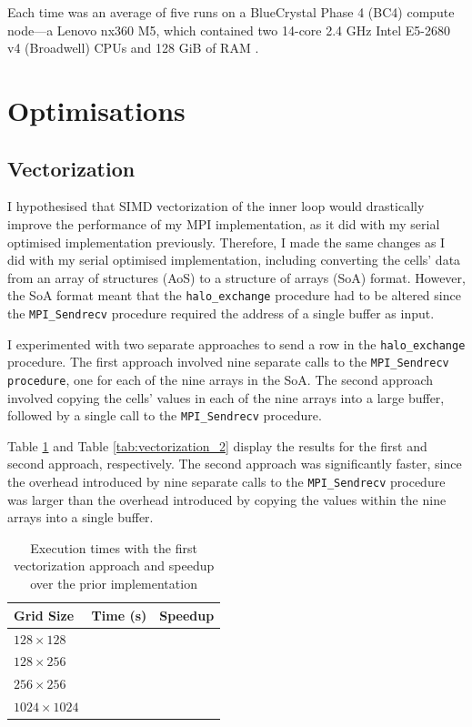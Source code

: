 \documentclass[twocolumn, a4paper]{article}
\begin{document}
Each time was an average of five runs on a BlueCrystal Phase 4 (BC4) compute node---a Lenovo nx360 M5, which contained two 14-core 2.4 GHz Intel E5-2680 v4 (Broadwell) CPUs and 128 GiB of RAM \cite{bcp4}.

\section{Optimisations}

\subsection{Vectorization}

I hypothesised that SIMD vectorization of the inner loop would drastically improve the performance of my MPI implementation, as it did with my serial optimised implementation previously.
Therefore, I made the same changes as I did with my serial optimised implementation, including converting the cells' data from an array of structures (AoS) to a structure of arrays (SoA) format.
However, the SoA format meant that the \texttt{halo\_exchange} procedure had to be altered since the \texttt{MPI\_Sendrecv} procedure required the address of a single buffer as input.

I experimented with two separate approaches to send a row in the \texttt{halo\_exchange} procedure.
The first approach involved nine separate calls to the \texttt{MPI\_Sendrecv procedure}, one for each of the nine arrays in the SoA.
The second approach involved copying the cells' values in each of the nine arrays into a large buffer, followed by a single call to the \texttt{MPI\_Sendrecv} procedure.

Table \ref{tab:vectorization_1} and Table \ref{tab:vectorization_2} display the results for the first and second approach, respectively.
The second approach was significantly faster, since the overhead introduced by nine separate calls to the \texttt{MPI\_Sendrecv} procedure was larger than the overhead introduced by copying the values within the nine arrays into a single buffer.

\begin{table}[htbp]
  \begin{center}
  \caption{Execution times with the first vectorization approach and speedup over the prior implementation}\label{tab:vectorization_1}
  \begin{tabular}[t]{l | l l} 
      \hline\hline
      Grid Size&Time (s)&Speedup\\
      \hline
      $128 \times 128$&\texttt{}&\texttt{}\\
      $128 \times 256$&\texttt{}&\texttt{}\\
      $256 \times 256$&\texttt{}&\texttt{}\\
      $1024 \times 1024$&\texttt{}&\texttt{}\\
      \hline
    \end{tabular}
  \end{center}
\end{table}
\end{document}
